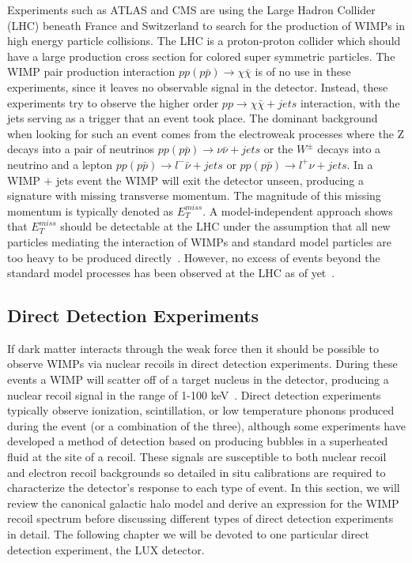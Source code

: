 Experiments such as ATLAS and CMS are using the Large Hadron Collider (LHC) beneath France and Switzerland to search for the production of WIMPs in high energy particle collisions.  The LHC is a proton-proton collider which should have a large production cross section for colored super symmetric particles.  The WIMP pair production interaction $pp (p\bar{p}) \rightarrow \chi \bar{\chi}$ is of no use in these experiments, since it leaves no observable signal in the detector.  Instead, these experiments try to observe the higher order $pp  \rightarrow \chi \bar{\chi} + jets$ interaction, with the jets serving as a trigger that an event took place.  The dominant background when looking for such an event comes from the electroweak processes where the Z decays into a pair of neutrinos $pp (p\bar{p}) \rightarrow \nu \bar{\nu} + jets$ or the $W^{\pm}$ decays into a neutrino and a lepton $pp (p\bar{p}) \rightarrow l^{-}\bar{\nu} + jets$ or $pp (p\bar{p}) \rightarrow l^{+}\nu + jets$. In a WIMP $+$ jets event the WIMP will exit the detector unseen, producing a signature with missing transverse momentum.  The magnitude of this missing momentum is typically denoted as $E_T^{miss}$.  A model-independent approach shows that $E_T^{miss}$ should be detectable at the LHC under the assumption that all new particles mediating the interaction of WIMPs and standard model particles are too heavy to be produced directly~\cite{Beltran}. However, no excess of events beyond the standard model processes has been observed at the LHC as of yet~\cite{ATLAS}.


\subsection{Direct Detection Experiments}\label{direct}
If dark matter interacts through the weak force then it should be possible to observe WIMPs via nuclear recoils in direct detection experiments. During these events a WIMP will scatter off of a target nucleus in the detector, producing a nuclear recoil signal in the range of 1-100 keV~\cite{Lewin}.   Direct detection experiments typically observe ionization, scintillation, or low temperature phonons produced during the event (or a combination of the three), although some experiments have developed a method of detection based on producing bubbles in a superheated fluid at the site of a recoil.  These signals are susceptible to both nuclear recoil and electron recoil backgrounds so detailed in situ calibrations are required to characterize the detector's response to each type of event.  In this section, we will review the canonical galactic halo model and derive an expression for the WIMP recoil spectrum before discussing different types of direct detection experiments in detail.  The following chapter we will be devoted to one particular direct detection experiment, the LUX detector.

